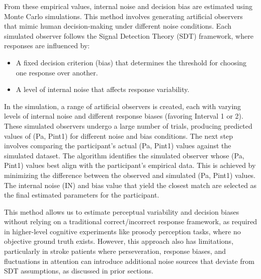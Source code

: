 From these empirical values, internal noise and decision bias are estimated using Monte Carlo simulations. This method involves generating artificial observers that mimic human decision-making under different noise conditions. Each simulated observer follows the Signal Detection Theory (SDT) framework, where responses are influenced by:
\begin{itemize}
    \item A fixed decision criterion (bias) that determines the threshold for choosing one response over another.
    \item A level of internal noise that affects response variability.
\end{itemize}
In the simulation, a range of artificial observers is created, each with varying levels of internal noise and different response biases (favoring Interval 1 or 2). These simulated observers undergo a large number of trials, producing predicted values of (Pa, Pint1) for different noise and bias conditions. The next step involves comparing the participant’s actual (Pa, Pint1) values against the simulated dataset. The algorithm identifies the simulated observer whose (Pa, Pint1) values best align with the participant’s empirical data. This is achieved by minimizing the difference between the observed and simulated (Pa, Pint1) values. The internal noise (IN) and bias value that yield the closest match are selected as the final estimated parameters for the participant.

This method allows us to estimate perceptual variability and decision biases without relying on a traditional correct/incorrect response framework, as required in higher-level cognitive experiments like prosody perception tasks, where no objective ground truth exists. However, this approach also has limitations, particularly in stroke patients where perseveration, response biases, and fluctuations in attention can introduce additional noise sources that deviate from SDT assumptions, as discussed in prior sections.

